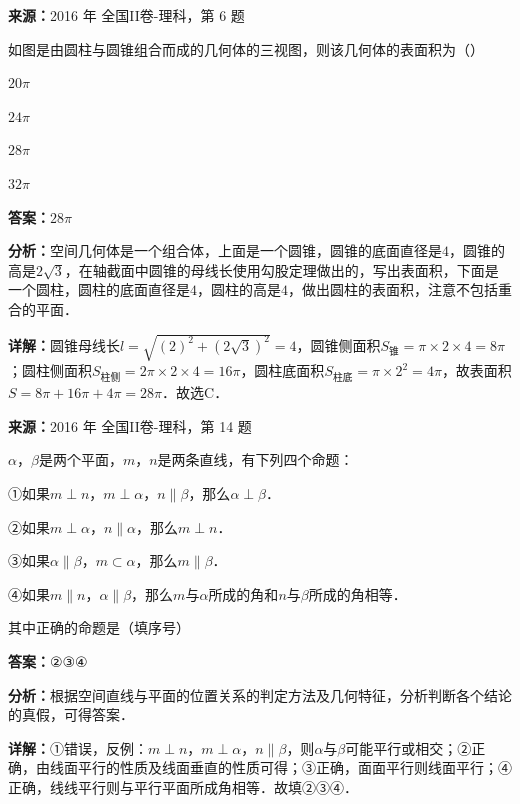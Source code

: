 \begin{question}[points=5]
\textbf{来源：}2016 年 全国II卷-理科，第 6 题\par
如图是由圆柱与圆锥组合而成的几何体的三视图，则该几何体的表面积为（\quad）
\begin{choices}
  \item $20\pi$
  \item $24\pi$
  \item $28\pi$
  \item $32\pi$
\end{choices}
\begin{solution}
\textbf{答案：}$28\pi$

\textbf{分析：}空间几何体是一个组合体，上面是一个圆锥，圆锥的底面直径是$4$，圆锥的高是$2\sqrt{3}$，在轴截面中圆锥的母线长使用勾股定理做出的，写出表面积，下面是一个圆柱，圆柱的底面直径是$4$，圆柱的高是$4$，做出圆柱的表面积，注意不包括重合的平面．

\textbf{详解：}圆锥母线长$l=\sqrt{(2)^2+(2\sqrt{3})^2}=4$，圆锥侧面积$S_{\text{锥}}=\pi\times2\times4=8\pi$；圆柱侧面积$S_{\text{柱侧}}=2\pi\times2\times4=16\pi$，圆柱底面积$S_{\text{柱底}}=\pi\times2^2=4\pi$，故表面积$S=8\pi+16\pi+4\pi=28\pi$．故选C．
\end{solution}
\end{question}

\begin{question}[points=5]
\textbf{来源：}2016 年 全国II卷-理科，第 14 题\par
$\alpha$，$\beta$是两个平面，$m$，$n$是两条直线，有下列四个命题：

①如果$m\perp n$，$m\perp\alpha$，$n\parallel\beta$，那么$\alpha\perp\beta$．

②如果$m\perp\alpha$，$n\parallel\alpha$，那么$m\perp n$．

③如果$\alpha\parallel\beta$，$m\subset\alpha$，那么$m\parallel\beta$．

④如果$m\parallel n$，$\alpha\parallel\beta$，那么$m$与$\alpha$所成的角和$n$与$\beta$所成的角相等．

其中正确的命题是（填序号）
\begin{solution}
\textbf{答案：}$\text{②③④}$

\textbf{分析：}根据空间直线与平面的位置关系的判定方法及几何特征，分析判断各个结论的真假，可得答案．

\textbf{详解：}①错误，反例：$m\perp n$，$m\perp\alpha$，$n\parallel\beta$，则$\alpha$与$\beta$可能平行或相交；②正确，由线面平行的性质及线面垂直的性质可得；③正确，面面平行则线面平行；④正确，线线平行则与平行平面所成角相等．故填②③④．
\end{solution}
\end{question}

